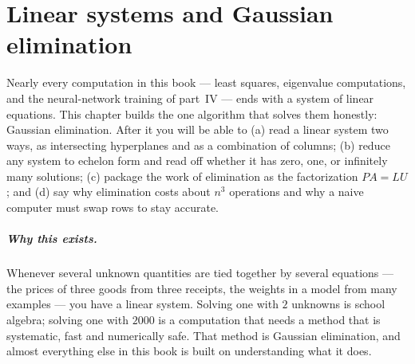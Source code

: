 \chapter{Linear systems and Gaussian elimination}\label{ch:elimination}

Nearly every computation in this book — least squares, eigenvalue computations, and the neural-network training of part~IV — ends with a system of linear equations. This chapter builds the one algorithm that solves them honestly: Gaussian elimination. After it you will be able to (a) read a linear system two ways, as intersecting hyperplanes and as a combination of columns; (b) reduce any system to echelon form and read off whether it has zero, one, or infinitely many solutions; (c) package the work of elimination as the factorization $PA=LU$; and (d) say why elimination costs about $n^3$ operations and why a naive computer must swap rows to stay accurate.

\paragraph{Why this exists.} Whenever several unknown quantities are tied together by
several equations --- the prices of three goods from three receipts, the weights in a model from many
examples --- you have a linear system. Solving one with $2$ unknowns is school algebra; solving one with $2000$
is a computation that needs a method that is systematic, fast and numerically safe. That method is Gaussian
elimination, and almost everything else in this book is built on understanding what it does.


